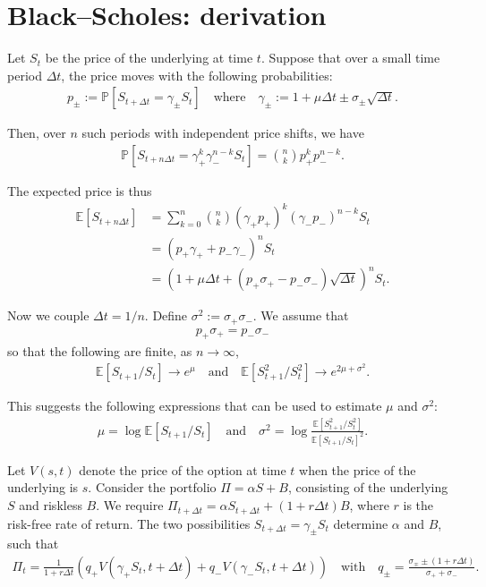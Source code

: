 \documentclass[12pt]{article}
\newcommand{\IP}{\mathbb{P}}
\newcommand{\IE}{\mathbb{E}}
\begin{document}
	
	\section*{Black--Scholes: derivation}
	
	Let $S_t$ be the price of the underlying at time $t$.
	Suppose that over a small time period $\Delta t$,
	the price moves 
	with the following probabilities:
	\begin{align}
		p_\pm
		:=
		\IP[
			S_{t + \Delta t} = \gamma_\pm S_t
		]
		\quad\text{where}\quad
		\gamma_\pm := 1 + \mu \Delta t \pm \sigma_\pm \sqrt{\Delta t}
		.
	\end{align}
	
	Then, over $n$ such periods
	with independent price shifts,
	we have
	\begin{align}
		\IP[
			S_{t + n \Delta t}
			=
			\gamma_+^{k}
			\gamma_-^{n - k}
			S_t
		]
		=
		\binom{n}{k}
		p_+^{k}
		p_-^{n - k}
		.
	\end{align}
	
	The expected price is thus
	\begin{align}
		\IE[S_{t + n \Delta t}]
		& =
		\sum_{k = 0}^n
		\binom{n}{k}
		(\gamma_+ p_+)^{k}
		(\gamma_- p_-)^{n - k}
		S_t
		\\ & =
		(
			p_+ \gamma_+
			+
			p_- \gamma_-
		)^n
		S_t
		\\ & =
		(
			1 + \mu \Delta t
			+
			(p_+ \sigma_+  -  p_- \sigma_-) \sqrt{\Delta t}
		)^n
		S_t
		.
	\end{align}
	
	Now we couple $\Delta t = 1 / n$.
	Define $\sigma^2 := \sigma_+ \sigma_-$.
	We assume that
	\begin{align}
		p_+ \sigma_+
		=
		p_- \sigma_-
	\end{align}
	so that
	the following are finite, as $n \to \infty$,
	\begin{align}
		\IE[S_{t + 1} / S_t] 
		\to 
		e^\mu
		\quad\text{and}\quad
		\IE[S_{t + 1}^2 / S_t^2] 
		\to
		e^{2 \mu + \sigma^2}
		.
	\end{align}
	
	This suggests 
	the following expressions that can be used to estimate $\mu$ and $\sigma^2$:
	\begin{align}
		\mu =
		\log \IE[S_{t + 1} / S_t]
		\quad\text{and}\quad
		\sigma^2
		=
		\log \frac{\IE[S_{t + 1}^2 / S_t^2]}{\IE[S_{t + 1} / S_t]^2}
		.
	\end{align}
	
	Let $V(s, t)$ denote the price of 
	the option at time $t$ when the price
	of the underlying is $s$.
	Consider the portfolio
	$\Pi = \alpha S + B$,
	consisting of the underlying $S$ and riskless $B$.
	We require
	$\Pi_{t + \Delta t} = \alpha S_{t + \Delta t} + (1 + r \Delta t) B$,
	where $r$ is the risk-free rate of return.
	The two possibilities $S_{t + \Delta t} = \gamma_\pm S_t$
	determine $\alpha$ and $B$,
	such that
	\begin{align}
		\Pi_t = 
		\frac{1}{1 + r \Delta t}
		\left(
			q_+
			V(\gamma_+ S_t, t + \Delta t)
			+
			q_-
			V(\gamma_- S_t, t + \Delta t)
		\right)
		\quad\text{with}\quad
		q_\pm
		=
		\frac{\sigma_\mp \pm (1 + r \Delta t)}{\sigma_+ + \sigma_-}
		.
	\end{align}
	
\end{document}
